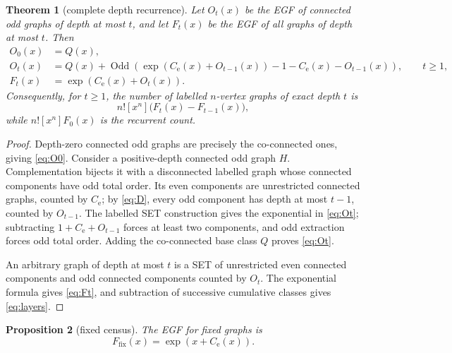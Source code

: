 \documentclass[10pt,a4paper]{amsart}
\newtheorem{theorem}{Theorem}[section]
\newtheorem{proposition}[theorem]{Proposition}
\theoremstyle{definition}
\theoremstyle{remark}
\newcommand{\Odd}{\operatorname{Odd}}
\begin{document}
\begin{theorem}[complete depth recurrence]\label{thm:egf}
Let \(O_t(x)\) be the EGF of connected odd graphs of depth at most \(t\), and
let \(F_t(x)\) be the EGF of all graphs of depth at most \(t\). Then
\begin{align}
 O_0(x)&=Q(x),                                             \label{eq:O0}\\
 O_t(x)&=Q(x)+\Odd\!\left(
  \exp(C_{\mathrm e}(x)+O_{t-1}(x))-1-C_{\mathrm e}(x)-O_{t-1}(x)
                         \right),\qquad t\geq1,           \label{eq:Ot}\\
 F_t(x)&=\exp(C_{\mathrm e}(x)+O_t(x)).                   \label{eq:Ft}
\end{align}
Consequently, for \(t\geq1\), the number of labelled \(n\)-vertex graphs of
exact depth \(t\) is
\begin{equation}
 n![x^n]\bigl(F_t(x)-F_{t-1}(x)\bigr),                    \label{eq:layers}
\end{equation}
while \(n![x^n]F_0(x)\) is the recurrent count.
\end{theorem}

\begin{proof}
Depth-zero connected odd graphs are precisely the co-connected ones, giving
\eqref{eq:O0}. Consider a positive-depth connected odd graph \(H\).
Complementation bijects it with a disconnected labelled graph whose
connected components have odd total order. Its even components are
unrestricted connected graphs, counted by \(C_{\mathrm e}\); by
\eqref{eq:D}, every odd component has depth at most \(t-1\), counted by
\(O_{t-1}\). The labelled SET construction gives the exponential in
\eqref{eq:Ot}; subtracting \(1+C_{\mathrm e}+O_{t-1}\) forces at least two
components, and odd extraction forces odd total order. Adding the
co-connected base class \(Q\) proves \eqref{eq:Ot}.

An arbitrary graph of depth at most \(t\) is a SET of unrestricted even
connected components and odd connected components counted by \(O_t\).
The exponential formula gives \eqref{eq:Ft}, and subtraction of successive
cumulative classes gives \eqref{eq:layers}.
\end{proof}

\begin{proposition}[fixed census]\label{prop:fixed}
The EGF for fixed graphs is
\begin{equation}
 F_{\mathrm{fix}}(x)=\exp(x+C_{\mathrm e}(x)).            \label{eq:Ffix}
\end{equation}
\end{proposition}
\end{document}
